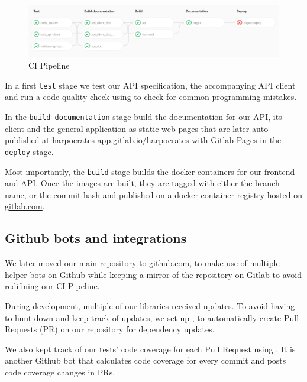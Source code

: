 \documentclass{l4proj}
\begin{document}
\begin{figure}[H]
    \centering
    \includegraphics[width=0.9\linewidth]{figures/ci.png}
    \caption{CI Pipeline}
    \label{fig:ci}
\end{figure}

In a first \verb|test| stage we test our API specification, the accompanying API client and run a code quality check using \textcite{CodeclimateCodeclimate2020} to check for common programming mistakes.

In the \verb|build-documentation| stage build the documentation for our API, its client and the general application as static web pages that are later auto published at \href{https://harpocrates-app.gitlab.io/harpocrates/}{harpocrates-app.gitlab.io/harpocrates} with Gitlab Pages in the \verb|deploy| stage.

Most importantly, the \verb|build| stage builds the docker containers for our frontend and API.
Once the images are built, they are tagged with either the branch name, or the commit hash and published on a \href{https://gitlab.com/harpocrates-app/harpocrates/container_registry}{docker container registry hosted on gitlab.com}.

\subsection{Github bots and integrations}

We later moved our main repository to \href{https://github.com/guillaumedsde/Harpocrates}{github.com}, to make use of multiple helper bots on Github while keeping a mirror of the repository on Gitlab to avoid redifining our CI Pipeline.

During development, multiple of our libraries received updates.
To avoid having to hunt down and keep track of updates, we set up \textcite{Dependabot2020}, to automatically create Pull Requests (PR) on our repository for dependency updates.

We also kept track of our tests' code coverage for each Pull Request using \textcite{Codecov2020}.
It is another Github bot that calculates code coverage for every commit and posts code coverage changes in PRs.
\end{document}
